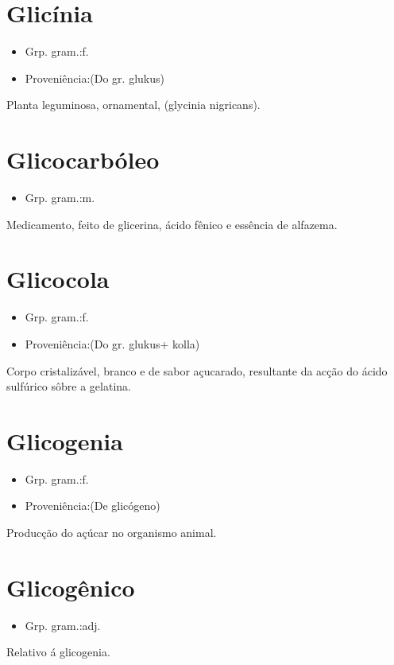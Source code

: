 \section{Glicínia}
\begin{itemize}
\item {Grp. gram.:f.}
\end{itemize}
\begin{itemize}
\item {Proveniência:(Do gr. \textunderscore glukus\textunderscore )}
\end{itemize}
Planta leguminosa, ornamental, (\textunderscore glycinia nigricans\textunderscore ).
\section{Glicocarbóleo}
\begin{itemize}
\item {Grp. gram.:m.}
\end{itemize}
Medicamento, feito de glicerina, ácido fênico e essência de alfazema.
\section{Glicocola}
\begin{itemize}
\item {Grp. gram.:f.}
\end{itemize}
\begin{itemize}
\item {Proveniência:(Do gr. \textunderscore glukus\textunderscore  + \textunderscore kolla\textunderscore )}
\end{itemize}
Corpo cristalizável, branco e de sabor açucarado, resultante da acção do ácido sulfúrico sôbre a gelatina.
\section{Glicogenia}
\begin{itemize}
\item {Grp. gram.:f.}
\end{itemize}
\begin{itemize}
\item {Proveniência:(De \textunderscore glicógeno\textunderscore )}
\end{itemize}
Producção do açúcar no organismo animal.
\section{Glicogênico}
\begin{itemize}
\item {Grp. gram.:adj.}
\end{itemize}
Relativo á glicogenia.
